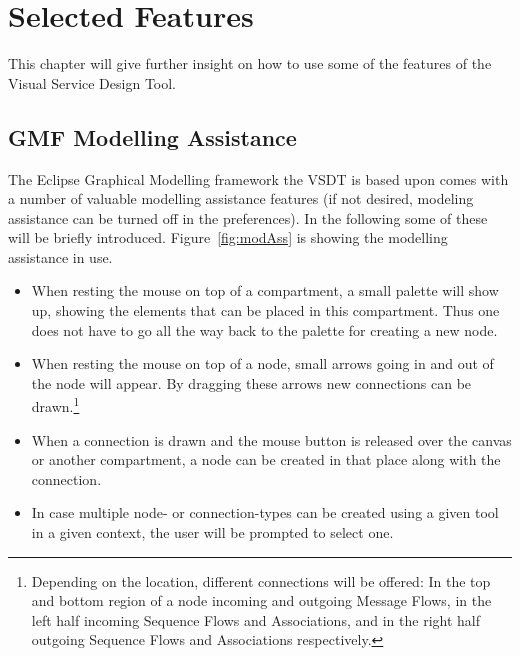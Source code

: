 \chapter{Selected Features}
\label{sec:user_features}

This chapter will give further insight on how to use some of the features of the
Visual Service Design Tool.



\section{GMF Modelling Assistance}
\label{sec:user_features_assistance}

The Eclipse Graphical Modelling framework the VSDT is based upon comes with a
number of valuable modelling assistance features (if not desired, modeling
assistance can be turned off in the preferences).  In the following some of these
will be briefly introduced.  Figure~\ref{fig:modAss} is showing the modelling
assistance in use.

\begin{itemize}
	\item When resting the mouse on top of a compartment, a small palette will
	show up, showing the elements that can be placed in this compartment.  Thus
	one does not have to go all the way back to the palette for creating a new
	node.
	
	\item When resting the mouse on top of a node, small arrows going in and out
	of the node will appear.  By dragging these arrows new connections can be
	drawn.\footnote{Depending on the location, different connections will be
	offered: In the top and bottom region of a node incoming and outgoing Message
	Flows, in the left half incoming Sequence Flows and Associations, and in the
	right half outgoing Sequence Flows and Associations respectively.}
	
	\item When a connection is drawn and the mouse button is released over the
	canvas or another compartment, a node can be created in that place along with
	the connection.
	
	\item In case multiple node- or connection-types can be created using a given
	tool in a given context, the user will be prompted to select one.
\end{itemize}

